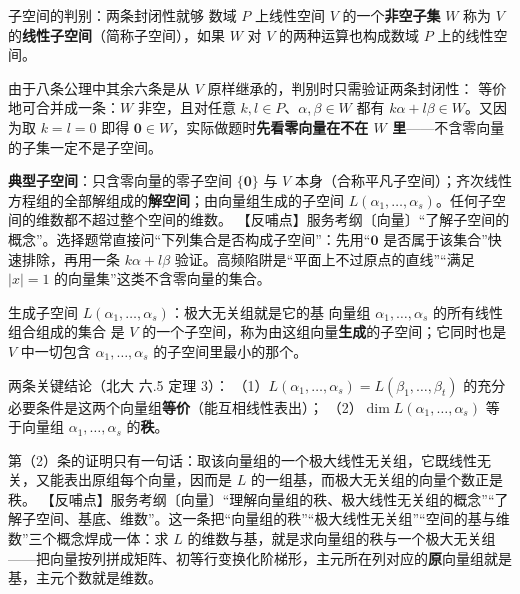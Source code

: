 \begin{fdeep}{子空间的判别：两条封闭性就够}
数域 $P$ 上线性空间 $V$ 的一个\textbf{非空子集} $W$ 称为 $V$ 的\textbf{线性子空间}（简称子空间），如果 $W$ 对 $V$ 的两种运算也构成数域 $P$ 上的线性空间。

由于八条公理中其余六条是从 $V$ 原样继承的，判别时只需验证两条封闭性：
等价地可合并成一条：$W$ 非空，且对任意 $k,l\in P$、$\alpha,\beta\in W$ 都有 $k\alpha+l\beta\in W$。又因为取 $k=l=0$ 即得 $\mathbf{0}\in W$，实际做题时\textbf{先看零向量在不在 $W$ 里}——不含零向量的子集一定不是子空间。

\textbf{典型子空间}：只含零向量的零子空间 $\{\mathbf{0}\}$ 与 $V$ 本身（合称平凡子空间）；齐次线性方程组的全部解组成的\textbf{解空间}；由向量组生成的子空间 $L(\alpha_1,\dots,\alpha_s)$。任何子空间的维数都不超过整个空间的维数。
【反哺点】服务考纲〔向量〕“了解子空间的概念”。选择题常直接问“下列集合是否构成子空间”：先用“$\mathbf{0}$ 是否属于该集合”快速排除，再用一条 $k\alpha+l\beta$ 验证。高频陷阱是“平面上不过原点的直线”“满足 $|x|=1$ 的向量集”这类不含零向量的集合。
\end{fdeep}

\begin{fdeep}{生成子空间 $L(\alpha_1,\dots,\alpha_s)$：极大无关组就是它的基}
向量组 $\alpha_1,\dots,\alpha_s$ 的所有线性组合组成的集合
是 $V$ 的一个子空间，称为由这组向量\textbf{生成}的子空间；它同时也是 $V$ 中一切包含 $\alpha_1,\dots,\alpha_s$ 的子空间里最小的那个。

两条关键结论（北大 六.5 定理 3）：
（1）$L(\alpha_1,\dots,\alpha_s)=L(\beta_1,\dots,\beta_t)$ 的充分必要条件是这两个向量组\textbf{等价}（能互相线性表出）；
（2）$\dim L(\alpha_1,\dots,\alpha_s)$ 等于向量组 $\alpha_1,\dots,\alpha_s$ 的\textbf{秩}。

第（2）条的证明只有一句话：取该向量组的一个极大线性无关组，它既线性无关，又能表出原组每个向量，因而是 $L$ 的一组基，而极大无关组的向量个数正是秩。
【反哺点】服务考纲〔向量〕“理解向量组的秩、极大线性无关组的概念”“了解子空间、基底、维数”。这一条把“向量组的秩”“极大线性无关组”“空间的基与维数”三个概念焊成一体：求 $L$ 的维数与基，就是求向量组的秩与一个极大无关组——把向量按列拼成矩阵、初等行变换化阶梯形，主元所在列对应的\textbf{原}向量组就是基，主元个数就是维数。
\end{fdeep}

